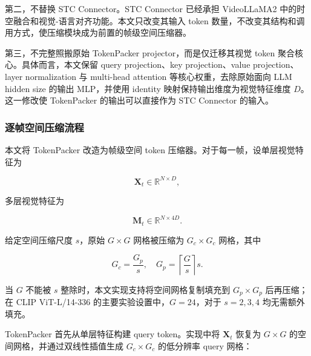 \par 第二，不替换 STC Connector。STC Connector 已经承担 VideoLLaMA2 中的时空融合和视觉-语言对齐功能\cite{videollama22024}。本文只改变其输入 token 数量，不改变其结构和调用方式，使压缩模块成为前置的帧级空间压缩器。

\par 第三，不完整照搬原始 TokenPacker projector，而是仅迁移其视觉 token 聚合核心。具体而言，本文保留 query projection、key projection、value projection、layer normalization 与 multi-head attention 等核心权重，去除原始面向 LLM hidden size 的输出 MLP，并使用 identity 映射保持输出维度为视觉特征维度 $D$。这一修改使 TokenPacker 的输出可以直接作为 STC Connector 的输入。

\subsubsection{逐帧空间压缩流程}

\par 本文将 TokenPacker 改造为帧级空间 token 压缩器。对于每一帧，设单层视觉特征为

\begin{equation}
    \label{equ:method-tokenpacker-input-single}
    \mathbf{X}_t \in \mathbb{R}^{N \times D},
\end{equation}

\par 多层视觉特征为

\begin{equation}
    \label{equ:method-tokenpacker-input-multi}
    \mathbf{M}_t \in \mathbb{R}^{N \times 4D}.
\end{equation}

\par 给定空间压缩尺度 $s$，原始 $G\times G$ 网格被压缩为 $G_c\times G_c$ 网格，其中

\begin{equation}
    \label{equ:method-compressed-grid}
    G_c = \frac{G_p}{s}, \quad
    G_p = \left\lceil \frac{G}{s} \right\rceil s.
\end{equation}

\par 当 $G$ 不能被 $s$ 整除时，本文实现支持将空间网格复制填充到 $G_p\times G_p$ 后再压缩；在 CLIP ViT-L/14-336 的主要实验设置中，$G=24$，对于 $s=2,3,4$ 均无需额外填充。

\par TokenPacker 首先从单层特征构建 query token。实现中将 $\mathbf{X}_t$ 恢复为 $G\times G$ 的空间网格，并通过双线性插值生成 $G_c\times G_c$ 的低分辨率 query 网格：

